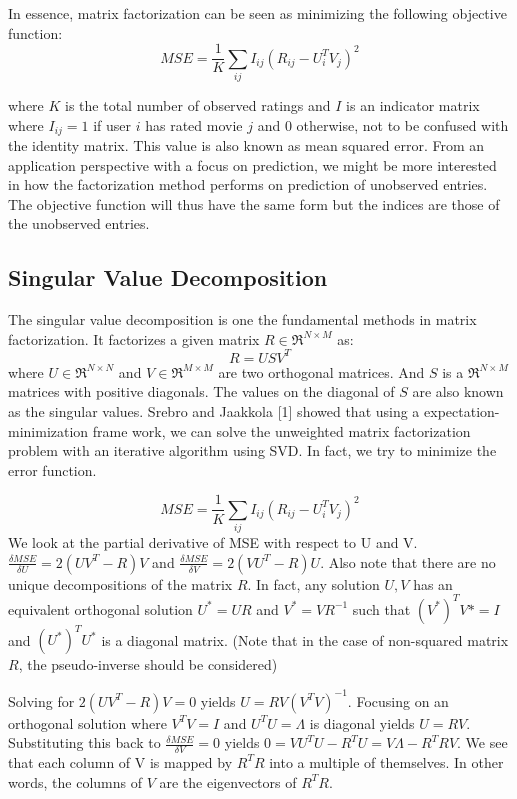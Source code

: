 \documentclass[journal,onecolumn]{IEEEtran}
\begin{document}
In essence, matrix factorization can be seen as minimizing the following objective function:
\begin{equation}
	MSE = \frac{1}{K}\sum_{ij} I_{ij} (R_{ij}-U_i^TV_j)^2
\end{equation}

where $ K $ is the total number of observed ratings and $ I $ is an indicator matrix where $ I_{ij} = 1$ if user $ i $ has rated movie $ j $ and $ 0 $ otherwise, not to be confused with the identity matrix. This value is also known as mean squared error. From an application perspective with a focus on prediction, we might be more interested in how the factorization method performs on prediction of unobserved entries. The objective function will thus have the same form but the indices are those of the unobserved entries. 

\subsection{Singular Value Decomposition}
The singular value decomposition is one the fundamental methods in matrix factorization. It factorizes a given matrix $ R \in \Re^{N\times M} $ as:
\begin{equation*}
	R = USV^T
\end{equation*}
where $ U \in \Re^{N\times N}$ and $ V \in \Re^{M\times M} $ are two orthogonal matrices. And $ S $ is a $ \Re^{N\times M} $ matrices with positive diagonals. The values on the diagonal of $ S $ are also known as the singular values. Srebro and Jaakkola [1] showed that using a expectation-minimization frame work, we can solve the unweighted matrix factorization problem with an iterative algorithm using SVD. In fact, we try to minimize the error function.

\begin{equation*}
MSE = \frac{1}{K}\sum_{ij} I_{ij} (R_{ij}-U_i^TV_j)^2
\end{equation*}
We look at the partial derivative of MSE with respect to U and V. $ \frac{\delta MSE}{\delta U} = 2(UV^T-R)V $ and $ \frac{\delta MSE}{\delta V} = 2(VU^T-R)U $. Also note that there are no unique decompositions of the matrix $ R $. In fact, any solution $ U, V $ has an equivalent orthogonal solution $ U^* = UR $ and $ V^* = VR^{-1} $ such that $ (V^*)^TV* = I $ and $ (U^*)^TU^* $ is a diagonal matrix. (Note that in the case of non-squared matrix $ R $, the pseudo-inverse should be considered) 

Solving for $ 2(UV^T-R)V = 0$ yields $ U = RV(V^TV)^{-1} $. Focusing on an orthogonal solution where $ V^TV = I $ and $ U^TU = \Lambda $ is diagonal yields $ U = RV $. Substituting this back to $ \frac{\delta MSE}{\delta V} = 0 $ yields $ 0 = VU^TU - R^TU = V\Lambda - R^TRV $. We see that each column of V is mapped by $ R^TR $ into a multiple of themselves. In other words, the columns of $ V $ are the eigenvectors of $ R^TR $. 
\end{document}
